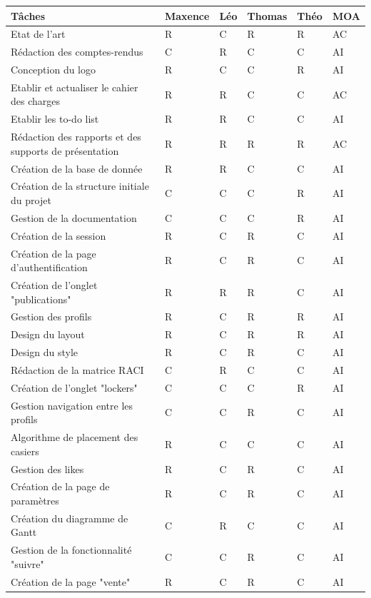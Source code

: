 \documentclass[11pt]{article}
\begin{document}
\vspace{0.2cm}
\begin{center}
\begin{tabular}{|p{6cm}|p{1.5cm}|p{1.5cm}|p{1.5cm}|p{1.5cm}|p{2cm}|}
\hline
\centering Tâches & 
\centering Maxence & 
\centering Léo & 
\centering Thomas & 
\centering Théo & 
\hspace{0.3cm} MOA\\

\hline
Etat de l'art & R & C & R & R & AC \\
\hline
Rédaction des comptes-rendus & C & R & C & C & AI \\
\hline
Conception du logo & R & C & C & R & AI \\
\hline
Etablir et actualiser le cahier des charges & R & R & C & C & AC \\
\hline
Etablir les to-do list & R & R & C & C & AI \\
\hline
Rédaction des rapports et des supports de présentation & R & R & R & R & AC \\
\hline
Création de la base de donnée & R & R & C & C & AI \\
\hline 
Création de la structure initiale du projet & C & C & C & R & AI \\
\hline
Gestion de la documentation & C & C & C & R & AI \\
\hline
Création de la session & R & C & R & C & AI \\
\hline
Création de la page d'authentification & R & C & R & C & AI \\
\hline
Création de l'onglet "publications" & R & R & R & C & AI \\
\hline
Gestion des profils & R & C & R & R & AI \\
\hline
Design du layout & R & C & R & R & AI \\
\hline
Design du style & R & C & R & C & AI \\
\hline
Rédaction de la matrice RACI & C & R & C & C & AI \\
\hline
Création de l'onglet "lockers" & C & C & C & R & AI \\
\hline
Gestion navigation entre les profils & C & C & R & C & AI \\
\hline
Algorithme de placement des casiers & R & C & C & C & AI \\
\hline
Gestion des likes & R & C & R & C & AI \\
\hline
Création de la page de paramètres & R & C & R & C & AI \\
\hline
Création du diagramme de Gantt & C & R & C & C & AI \\
\hline
Gestion de la fonctionnalité "suivre" & C & C & R & C & AI \\
\hline
Création de la page "vente" & R & C & R & C & AI \\
\hline


\end{tabular}
\end{center}
\end{document}
